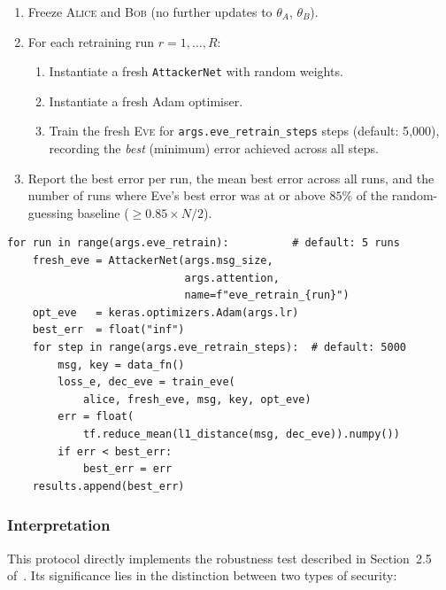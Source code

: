 \documentclass[12pt, a4paper]{article}
\newcommand{\alice}{\textsc{Alice}}
\newcommand{\bob}{\textsc{Bob}}
\newcommand{\eve}{\textsc{Eve}}
\newcommand{\thetaA}{\theta_{\!A}}
\newcommand{\thetaB}{\theta_{\!B}}
\newcommand{\code}[1]{\texttt{\color{CodeRed}#1}}
\begin{document}
\begin{enumerate}[leftmargin=2em, itemsep=4pt]
  \item Freeze \alice{} and \bob{} (no further updates to
        $\thetaA$, $\thetaB$).
  \item For each retraining run $r = 1, \ldots, R$:
    \begin{enumerate}[label=\alph*., leftmargin=1.5em]
      \item Instantiate a fresh \code{AttackerNet} with random weights.
      \item Instantiate a fresh Adam optimiser.
      \item Train the fresh \eve{} for \code{args.eve\_retrain\_steps}
            steps (default: 5{,}000), recording the \emph{best}
            (minimum) error achieved across all steps.
    \end{enumerate}
  \item Report the best error per run, the mean best error across all
        runs, and the number of runs where Eve's best error was at
        or above $85\%$ of the random-guessing baseline ($\geq 0.85
        \times N/2$).
\end{enumerate}

\begin{lstlisting}[caption={Post-training Eve retraining in \code{main\_enhanced.py}}]
for run in range(args.eve_retrain):          # default: 5 runs
    fresh_eve = AttackerNet(args.msg_size,
                            args.attention,
                            name=f"eve_retrain_{run}")
    opt_eve   = keras.optimizers.Adam(args.lr)
    best_err  = float("inf")
    for step in range(args.eve_retrain_steps):  # default: 5000
        msg, key = data_fn()
        loss_e, dec_eve = train_eve(
            alice, fresh_eve, msg, key, opt_eve)
        err = float(
            tf.reduce_mean(l1_distance(msg, dec_eve)).numpy())
        if err < best_err:
            best_err = err
    results.append(best_err)
\end{lstlisting}

\subsubsection*{Interpretation}

This protocol directly implements the robustness test described in
Section~2.5 of~\cite{abadi2016learning}. Its significance lies in
the distinction between two types of security:
\end{document}
